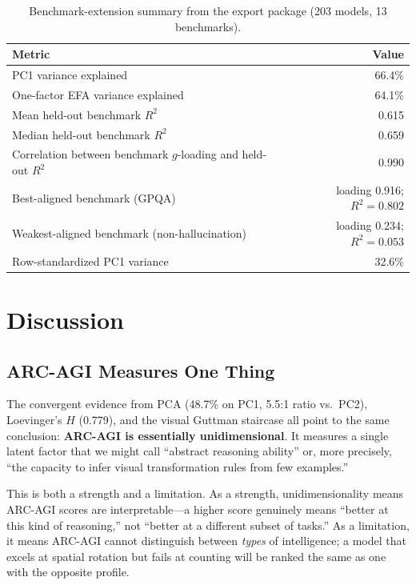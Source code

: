 \documentclass[11pt, letterpaper]{article}
\begin{document}
\begin{table}[H]
\centering
\caption{Benchmark-extension summary from the export package (203 models, 13 benchmarks).}
\label{tab:benchmark_extension}
\begin{tabular}{p{4.7in}r}
\toprule
\textbf{Metric} & \textbf{Value} \\
\midrule
PC1 variance explained & 66.4\% \\
One-factor EFA variance explained & 64.1\% \\
Mean held-out benchmark $R^2$ & 0.615 \\
Median held-out benchmark $R^2$ & 0.659 \\
Correlation between benchmark $g$-loading and held-out $R^2$ & 0.990 \\
Best-aligned benchmark (GPQA) & loading 0.916; $R^2 = 0.802$ \\
Weakest-aligned benchmark (non-hallucination) & loading 0.234; $R^2 = 0.053$ \\
Row-standardized PC1 variance & 32.6\% \\
\bottomrule
\end{tabular}
\end{table}

\section{Discussion}
\label{sec:discussion}

\subsection{ARC-AGI Measures One Thing}

The convergent evidence from PCA (48.7\% on PC1, 5.5:1 ratio vs.\ PC2), Loevinger's $H$ (0.779), and the visual Guttman staircase all point to the same conclusion: \textbf{ARC-AGI is essentially unidimensional}. It measures a single latent factor that we might call ``abstract reasoning ability'' or, more precisely, ``the capacity to infer visual transformation rules from few examples.''

This is both a strength and a limitation. As a strength, unidimensionality means ARC-AGI scores are interpretable---a higher score genuinely means ``better at this kind of reasoning,'' not ``better at a different subset of tasks.'' As a limitation, it means ARC-AGI cannot distinguish between \textit{types} of intelligence; a model that excels at spatial rotation but fails at counting will be ranked the same as one with the opposite profile.
\end{document}
